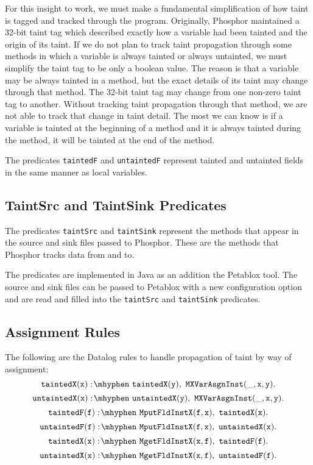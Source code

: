 For this insight to work, we must make a fundamental simplification of how taint is tagged and tracked through the program. Originally, Phosphor maintained a 32-bit taint tag which described exactly how a variable had been tainted and the origin of its taint. If we do not plan to track taint propagation through some methods in which a variable is always tainted or always untainted, we must simplify the taint tag to be only a boolean value. The reason is that a variable may be always tainted in a method, but the exact details of its taint may change through that method. The 32-bit taint tag may change from one non-zero taint tag to another. Without tracking taint propagation through that method, we are not able to track that change in taint detail. The most we can know is if a variable is tainted at the beginning of a method and it is always tainted during the method, it will be tainted at the end of the method.

The predicates \texttt{taintedF} and \texttt{untaintedF} represent tainted and untainted fields in the same manner as local variables.
\subsection{TaintSrc and TaintSink Predicates}
The predicates \texttt{taintSrc} and \texttt{taintSink} represent the methods that appear in the source and sink files passed to Phosphor. These are the methods that Phosphor tracks data from and to.

The predicates are implemented in Java as an addition the Petablox tool. The source and sink files can be passed to Petablox with a new configuration option and are read and filled into the \texttt{taintSrc} and \texttt{taintSink} predicates.
\subsection{Assignment Rules}
The following are the Datalog rules to handle propagation of taint by way of assignment:
\begin{equation}
  \mathtt{taintedX(x) \is taintedX(y) \also  MXVarAsgnInst(\_,x,y).}
\end{equation}
\begin{equation}
  \mathtt{untaintedX(x) \is untaintedX(y) \also MXVarAsgnInst(\_,x,y).}
\end{equation}
\begin{equation}
  \mathtt{taintedF(f) \is MputFldInstX(f,x) \also taintedX(x).}
\end{equation}
\begin{equation}
  \mathtt{untaintedF(f) \is MputFldInstX(f,x) \also untaintedX(x).}
\end{equation}
\begin{equation}
  \mathtt{taintedX(x) \is MgetFldInstX(x,f) \also taintedF(f).}
\end{equation}
\begin{equation}
  \mathtt{untaintedX(x) \is MgetFldInstX(x,f) \also untaintedF(f).}
\end{equation}

